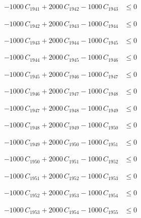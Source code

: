 \documentclass[a4paper,11pt]{article}
\begin{document}
\begin{align}
-1000\,C_{1941} + 2000\,C_{1942} - 1000\,C_{1943} &\leq 0 \nonumber
\end{align}

\begin{align}
-1000\,C_{1942} + 2000\,C_{1943} - 1000\,C_{1944} &\leq 0 \nonumber
\end{align}

\begin{align}
-1000\,C_{1943} + 2000\,C_{1944} - 1000\,C_{1945} &\leq 0 \nonumber
\end{align}

\begin{align}
-1000\,C_{1944} + 2000\,C_{1945} - 1000\,C_{1946} &\leq 0 \nonumber
\end{align}

\begin{align}
-1000\,C_{1945} + 2000\,C_{1946} - 1000\,C_{1947} &\leq 0 \nonumber
\end{align}

\begin{align}
-1000\,C_{1946} + 2000\,C_{1947} - 1000\,C_{1948} &\leq 0 \nonumber
\end{align}

\begin{align}
-1000\,C_{1947} + 2000\,C_{1948} - 1000\,C_{1949} &\leq 0 \nonumber
\end{align}

\begin{align}
-1000\,C_{1948} + 2000\,C_{1949} - 1000\,C_{1950} &\leq 0 \nonumber
\end{align}

\begin{align}
-1000\,C_{1949} + 2000\,C_{1950} - 1000\,C_{1951} &\leq 0 \nonumber
\end{align}

\begin{align}
-1000\,C_{1950} + 2000\,C_{1951} - 1000\,C_{1952} &\leq 0 \nonumber
\end{align}

\begin{align}
-1000\,C_{1951} + 2000\,C_{1952} - 1000\,C_{1953} &\leq 0 \nonumber
\end{align}

\begin{align}
-1000\,C_{1952} + 2000\,C_{1953} - 1000\,C_{1954} &\leq 0 \nonumber
\end{align}

\begin{align}
-1000\,C_{1953} + 2000\,C_{1954} - 1000\,C_{1955} &\leq 0 \nonumber
\end{align}
\end{document}
